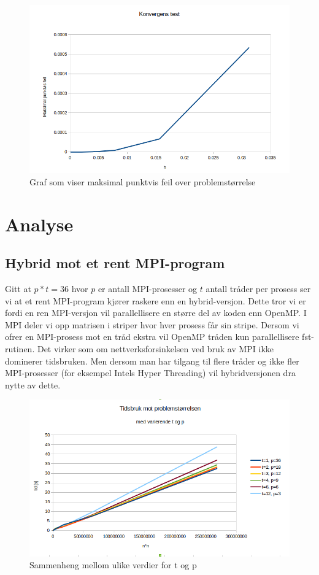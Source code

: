 \documentclass[11pt,norsk,a4paper]{article}
\begin{document}
\begin{figure}[h]
\centering
\includegraphics[scale=0.5]{plot_konvergens.png}
\caption{Graf som viser maksimal punktvis feil over problemstørrelse}
\end{figure}


\section{Analyse}

\subsection{Hybrid mot et rent MPI-program}

Gitt at $p*t=36$ hvor $p$ er antall MPI-prosesser og $t$ antall tråder per prosess ser vi at et rent MPI-program kjører raskere enn en hybrid-versjon. Dette tror vi er fordi en ren MPI-versjon vil parallellisere en større del av koden enn OpenMP. I MPI deler vi opp matrisen i striper hvor hver prosess får sin stripe. Dersom vi ofrer en MPI-prosess mot en tråd ekstra vil OpenMP tråden kun parallellisere fst-rutinen. Det virker som om nettverksforsinkelsen ved bruk av MPI ikke dominerer tidsbruken. Men dersom man har tilgang til flere tråder og ikke fler MPI-prosesser (for eksempel Intels Hyper Threading) vil hybridversjonen dra nytte av dette. 

\begin{figure}[h]
\centering
\includegraphics[scale=0.5]{plot_t_p.png}
\caption{Sammenheng mellom ulike verdier for t og p}
\end{figure}
\end{document}
